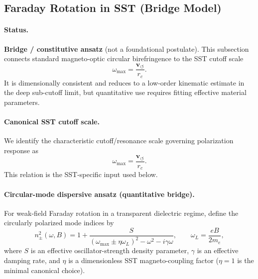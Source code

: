 \documentclass[10pt]{article}
\newcommand{\vswirl}{\mathbf{v}_{\!\boldsymbol{\circlearrowleft}}}
\newcommand{\rc}{r_c}                                    %
\begin{document}
    \subsection{Faraday Rotation in SST (Bridge Model)}
        \label{subsec:sst-faraday-bridge}

        \paragraph{Status.}
            \textbf{Bridge / constitutive ansatz} (not a foundational postulate). This subsection connects standard magneto-optic circular birefringence to the SST cutoff scale
            \[
                \omega_{\max}=\frac{\vswirl}{\rc}.
            \]
            It is dimensionally consistent and reduces to a low-order kinematic estimate in the deep sub-cutoff limit, but quantitative use requires fitting effective material parameters.

        \paragraph{Canonical SST cutoff scale.}
            We identify the characteristic cutoff/resonance scale governing polarization response as
            \begin{equation}
                \omega_{\max}=\frac{\vswirl}{\rc}.
                \label{eq:sst-faraday-omega-max}
            \end{equation}
            This relation is the SST-specific input used below.

        \paragraph{Circular-mode dispersive ansatz (quantitative bridge).}
            For weak-field Faraday rotation in a transparent dielectric regime, define the circularly polarized mode indices by
            \begin{equation}
                n_\pm^2(\omega,B)
                =
                1+\frac{S}{\left(\omega_{\max}\pm \eta \omega_L\right)^2-\omega^2-i\gamma\omega},
                \qquad
                \omega_L=\frac{eB}{2m_e},
                \label{eq:sst-faraday-npm}
            \end{equation}
            where \(S\) is an effective oscillator-strength density parameter, \(\gamma\) is an effective damping rate, and \(\eta\) is a dimensionless SST magneto-coupling factor (\(\eta=1\) is the minimal canonical choice).
\end{document}
